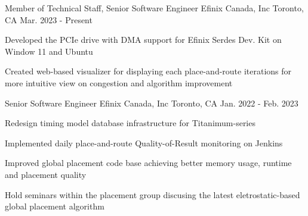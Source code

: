 
\begin{cventries}

\cventry
{Member of Technical Staff, Senior Software Engineer} %
{Efinix Canada, Inc} %
{Toronto, CA} %
{Mar. 2023 - Present} %
{
\begin{cvitems}
\item {
    Developed the PCIe drive with DMA support for Efinix Serdes Dev. Kit 
    on Window 11 and Ubuntu
}
\item {
    Created web-based visualizer for displaying each place-and-route iterations 
    for more intuitive view on congestion and algorithm improvement
}
\end{cvitems}
}
\vspace{2mm}

\cventry
{Senior Software Engineer} %
{Efinix Canada, Inc} %
{Toronto, CA} %
{Jan. 2022 - Feb. 2023} %
{
\begin{cvitems}
\item {
    Redesign timing model database infrastructure for Titanimum-series
}
\item {
    Implemented daily place-and-route Quality-of-Result monitoring on Jenkins
}
\item {
    Improved global placement code base achieving 
    better memory usage, runtime and placement quality
}
\item {
    Hold seminars within the placement group discusing 
    the latest eletrostatic-based global placement algorithm 
}
\end{cvitems}
}

\end{cventries}